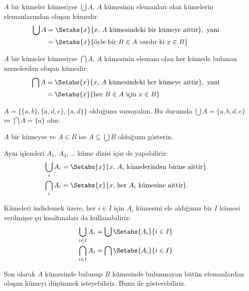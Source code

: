\begin{defn}
$A$ bir kümeler kümesiyse $\bigcup A$, $A$ kümesinin elemanları olan
kümelerin elemanlarından oluşan kümedir:
\begin{align*}
\bigcup A & = \Setabs{x}{x \text{, } A\text{ kümesindeki bir kümeye aittir}},
\text{ yani}\\
& = \Setabs{x}{\text{öyle bir } B \in A
  \text{ vardır ki } x \in B}
\end{align*}
\end{defn}

\begin{defn}
$A$ bir kümeler kümesiyse $\bigcap A$, $A$ kümesinin elemanı olan her kümede
bulunan nesnelerden oluşan kümedir:
\begin{align*}
\bigcap A & = \Setabs{x}{x \text{, } A\text{ kümesindeki her kümeye aittir}},
\text{ yani}\\
 & = \Setabs{x}{\text{her } B \in A \text{ için } x \in B}
\end{align*}
\end{defn}

\begin{ex}
$A = \{ \{ a, b \}, \{ a, d, e \}, \{ a, d \} \}$ olduğunu varsayalım.
Bu durumda $\bigcup A = \{ a, b, d, e \}$ ve $\bigcap A = \{ a \}$ olur.
\end{ex}
\begin{prob}
	$A$ bir kümeyse ve $A \in B$ ise $A \subseteq \bigcup B$ olduğunu gösterin.
\end{prob}

Aynı işlemleri $A_1$, $A_2$, \dots{} küme dizisi için de yapabiliriz:
\begin{align*}
\bigcup_i A_i & = \Setabs{x}{x \text{, } A_i\text{ kümelerinden birine aittir}}\\
\bigcap_i A_i & = \Setabs{x}{x \text{, her } A_i\text{ kümesine aittir}}.
\end{align*}

Kümeleri indislemek üzere, her $i \in I$ için $A_i$ kümesini ele aldığımız bir
$I$ kümesi verilmişse şu kısaltmaları da kullanabiliriz:
\begin{align*}
	\bigcup_{i \in I} A_i & = \bigcup \Setabs{A_i }{i \in I}\\
	\bigcap_{i \in I} A_i & = \bigcap\Setabs{A_i}{i \in I}
\end{align*}

Son olarak $A$ kümesinde bulunup $B$ kümesinde bulunmayan bütün elemanlardan
oluşan kümeyi düşünmek isteyebiliriz. Bunu  ile
gösterebiliriz.

